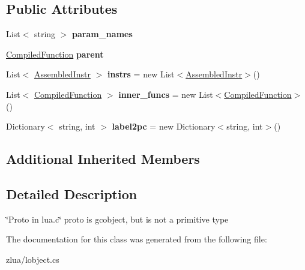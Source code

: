 \subsection*{Public Attributes}
\begin{DoxyCompactItemize}
\item 
\mbox{\label{classzlua_1_1_compiled_function_a1f6f1c48793a163d632ea42d5a5693b4}} 
List$<$ string $>$ {\bfseries param\+\_\+names}
\item 
\mbox{\label{classzlua_1_1_compiled_function_a503d3c1785d7bfa6c9397db569c6e09e}} 
\mbox{\hyperlink{classzlua_1_1_compiled_function}{Compiled\+Function}} {\bfseries parent}
\item 
\mbox{\label{classzlua_1_1_compiled_function_a30fd2db9dbd3e461f92f86928130d514}} 
List$<$ \mbox{\hyperlink{classzlua_1_1_assembled_instr}{Assembled\+Instr}} $>$ {\bfseries instrs} = new List$<$\mbox{\hyperlink{classzlua_1_1_assembled_instr}{Assembled\+Instr}}$>$()
\item 
\mbox{\label{classzlua_1_1_compiled_function_aa4fd3601855cf91d034a2d4ff43b7a75}} 
List$<$ \mbox{\hyperlink{classzlua_1_1_compiled_function}{Compiled\+Function}} $>$ {\bfseries inner\+\_\+funcs} = new List$<$\mbox{\hyperlink{classzlua_1_1_compiled_function}{Compiled\+Function}}$>$()
\item 
\mbox{\label{classzlua_1_1_compiled_function_ab4bc14259fb6e1e10152f6a0d766f143}} 
Dictionary$<$ string, int $>$ {\bfseries label2pc} = new Dictionary$<$string, int$>$()
\end{DoxyCompactItemize}
\subsection*{Additional Inherited Members}


\subsection{Detailed Description}
\char`\"{}\+Proto in lua.\+c\char`\"{} proto is gcobject, but is not a primitive type 



The documentation for this class was generated from the following file\+:\begin{DoxyCompactItemize}
\item 
zlua/lobject.\+cs\end{DoxyCompactItemize}
